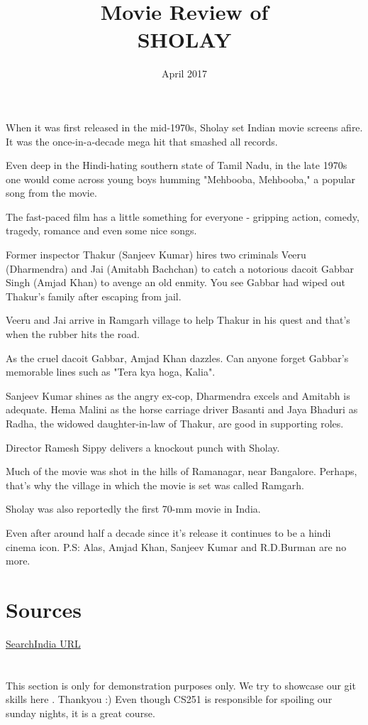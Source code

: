 \documentclass{article}
\title{Movie Review of\\\textsc{\LARGE{SHOLAY}}}
\date{April 2017}
\begin{document}
\maketitle

\section*{}

When it was first released in the mid-1970s, Sholay set Indian movie screens afire. It was the once-in-a-decade mega hit that smashed all records.

Even deep in the Hindi-hating southern state of Tamil Nadu, in the late 1970s one would come across young boys humming "Mehbooba, Mehbooba," a popular song from the movie.

The fast-paced film has a little something for everyone - gripping action, comedy, tragedy, romance and even some nice songs. 

Former inspector Thakur (Sanjeev Kumar) hires two criminals Veeru (Dharmendra) and Jai (Amitabh Bachchan) to catch a notorious dacoit Gabbar Singh (Amjad Khan) to avenge an old enmity. You see Gabbar had wiped out Thakur's family after escaping from jail.

Veeru and Jai arrive in Ramgarh village to help Thakur in his quest and that's when the rubber hits the road.

As the cruel dacoit Gabbar, Amjad Khan dazzles. Can anyone forget Gabbar's memorable lines such as "Tera kya hoga, Kalia".

Sanjeev Kumar shines as the angry ex-cop, Dharmendra excels and Amitabh is adequate. Hema Malini as the horse carriage driver Basanti and Jaya Bhaduri as Radha, the widowed daughter-in-law of Thakur, are good in supporting roles.

Director Ramesh Sippy delivers a knockout punch with Sholay.

Much of the movie was shot in the hills of Ramanagar, near Bangalore. Perhaps, that's why the village in which the movie is set was called Ramgarh.

Sholay was also reportedly the first 70-mm movie in India.

Even after around half a decade since it's release it continues to be a hindi cinema icon. 
P.S: Alas, Amjad Khan, Sanjeev Kumar and R.D.Burman are no more.

\section*{Sources}
\href{http://www.searchindia.com/search/bollywood-movies/sholay.html}{SearchIndia URL}

\section*{}

This section is only for demonstration purposes only. We try to showcase our git skills here . Thankyou :)
Even though CS251 is responsible for spoiling our sunday nights, it is a great course. 
\end{document}
